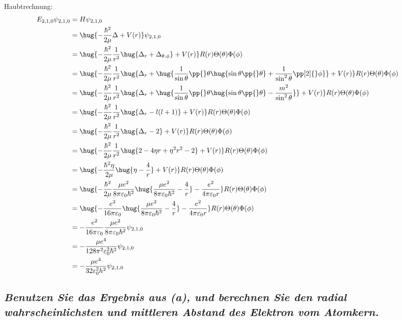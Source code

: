 \documentclass[ex,minted]{exercise_4.0}
\begin{document}
Haubtrechnung:
\begin{align*}
    E_{2,1,0} \psi_{2,1,0} 
    &= H \psi_{2,1,0}\\
    &= \hug{-\frac{\hbar^2}{2\mu}\Delta + V(r)} \psi_{2,1,0}\\
    &= \hug{-\frac{\hbar^2}{2\mu}\frac1{r^2}\hug{\Delta_r + \Delta_{\theta,\phi}} + V(r)} R(r) \Theta(\theta) \Phi(\phi) \\ 
    &= \hug{-\frac{\hbar^2}{2\mu}\frac1{r^2}\hug{\Delta_r + \hug{{\frac{1}{\sin\theta}\pp{}\theta\hug{\sin\theta\pp{}\theta} + \frac{1}{\sin^2\theta}\pp[2]{}\phi}}} + V(r)} R(r) \Theta(\theta) \Phi(\phi) \\ 
    &= \hug{-\frac{\hbar^2}{2\mu}\frac1{r^2}\hug{\Delta_r + \hug{{\frac{1}{\sin\theta}\pp{}\theta\hug{\sin\theta\pp{}\theta} - \frac{m^2}{\sin^2\theta}}}} + V(r)} R(r) \Theta(\theta) \Phi(\phi) \\ 
    &= \hug{-\frac{\hbar^2}{2\mu}\frac1{r^2}\hug{\Delta_r -l(l+1)} + V(r)}  R(r) \Theta(\theta) \Phi(\phi) \\ 
    &= \hug{-\frac{\hbar^2}{2\mu}\frac1{r^2}\hug{\Delta_r - 2 } + V(r)}  R(r) \Theta(\theta) \Phi(\phi) \\ 
    &= \hug{-\frac{\hbar^2}{2\mu}\frac1{r^2}\hug{2 - 4 \eta r+ \eta^2 r^2 - 2 } + V(r)}  R(r) \Theta(\theta) \Phi(\phi) \\ 
    &= \hug{-\frac{\hbar^2 \eta }{2\mu}\hug{\eta -\frac4r} + V(r)}  R(r) \Theta(\theta) \Phi(\phi) \\ 
    &= \hug{-\frac{\hbar^2}{2\mu}\frac{\mu e^2}{8\pi \varepsilon_0\hbar^2}\hug{\frac{\mu e^2}{8\pi \varepsilon_0\hbar^2} -\frac4r} - \frac{e^2}{4\pi\varepsilon_0 r}}  R(r) \Theta(\theta) \Phi(\phi) \\ 
    &= \hug{-\frac{e^2}{16\pi \varepsilon_0}\hug{\frac{\mu e^2}{8\pi \varepsilon_0\hbar^2} -\frac4r} - \frac{e^2}{4\pi\varepsilon_0 r}}  R(r) \Theta(\theta) \Phi(\phi) \\ 
    &= -\frac{e^2}{16\pi \varepsilon_0}\frac{\mu e^2}{8\pi \varepsilon_0\hbar^2}  \psi_{2,1,0} \\ 
    &= -\frac{\mu e^4}{128\pi^2 \varepsilon_0^2 \hbar^2}  \psi_{2,1,0} \\ 
    &= -\frac{\mu e^4}{32 \varepsilon_0^2 h ^2}  \psi_{2,1,0} \\ 
\end{align*}


\subsection{\it Benutzen Sie das Ergebnis aus (a), und berechnen Sie den radial wahrscheinlichsten und mittleren Abstand des Elektron vom Atomkern.}
\end{document}
